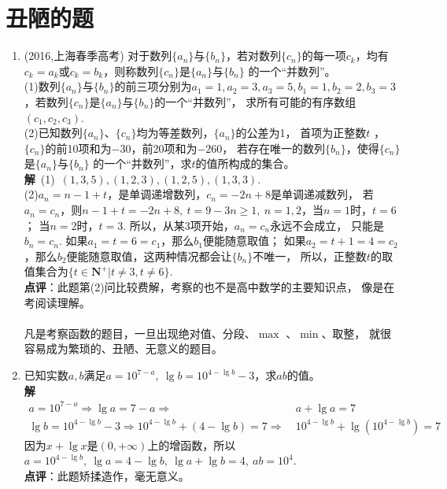 \section{丑陋的题}
\begin{enumerate}[label={【\textbf{例\thechapter.\arabic*}】},
 leftmargin=\inteval{\myenumleftmargin}pt,
 itemsep=\inteval{\myenumitempsep}pt,
 itemindent=\inteval{\myenumitemindent}pt]
\item (2016,上海春季高考)
对于数列$ \{a_n\} $与$ \{b_n\} $，若对数列$ \{c_n\} $的每一项$ c_k $，均有
$ c_k=a_k $或$ c_k=b_k $，则称数列$ \{c_n\} $是$ \{a_n\} $与$ \{b_n\} $
的一个“并数列”。\\
(1)数列$ \{a_n\} $与$ \{b_n\} $的前三项分别为$ a_1=1,a_2=3,a_3=5,b_1=1,b_2=2,
b_3=3 $，若数列$ \{c_n\} $是$ \{a_n\} $与$ \{b_n\} $的一个“并数列”，
求所有可能的有序数组$ (c_1,c_2,c_3) $. \\
(2)已知数列$ \{a_n\} $、$ \{c_n\} $均为等差数列，$ \{a_n\} $的公差为1，
首项为正整数$ t $ ，$ \{c_n\} $的前10项和为$ -30 $，前20项和为$ -260 $，
若存在唯一的数列$ \{b_n\} $，使得$ \{c_n\} $是$ \{a_n\} $与$ \{b_n\} $
的一个“并数列”，求$ t $的值所构成的集合。\\
\textbf{解}\ (1)\ $ (1,3,5),(1,2,3),(1,2,5),(1,3,3) $. \\
(2)$ a_n=n-1+t $，是单调递增数列，$ c_n=-2n+8 $是单调递减数列，
若$ a_n=c_n $，则$ n-1+t=-2n+8,\ t=9-3n\geq 1,\ n=1,2 $，当$ n=1 $时，$ t=6 $；
当$ n=2 $时，$ t=3 $. 所以，从某3项开始，$ a_n=c_n $永远不会成立，
只能是$ b_n=c_n $. 如果$ a_1=t=6=c_1 $，那么$ b_1 $便能随意取值；
如果$ a_2=t+1=4=c_2 $，那么$ b_2 $便能随意取值，这两种情况都会让$ \{b_n\} $不唯一，
所以，正整数$ t $的取值集合为$ \{t\in \textbf{N}^+|t\neq 3,t\neq 6\} $. \\
\textbf{点评}：此题第(2)问比较费解，考察的也不是高中数学的主要知识点，
像是在考阅读理解。\\
\\
凡是考察函数的题目，一旦出现绝对值、分段、$ \max $ 、$ \min $、取整，
就很容易成为繁琐的、丑陋、无意义的题目。

\item 已知实数$ a,b $满足$ a=10^{7-a},\ \lg b=10^{4-\lg b}-3 $，求$ ab $的值。\\
\textbf{解}\ 
\begin{align*}
    a=10^{7-a} \Rightarrow \lg a=7-a \Rightarrow &\  a+\lg a=7 \\
    \lg b=10^{4-\lg b}-3 \Rightarrow 10^{4-\lg b}+(4-\lg b)=7 \Rightarrow & \ 
    10^{4-\lg b}+\lg (10^{4-\lg b})=7 
\end{align*}
因为$ x+\lg x $是$ (0,+\infty) $上的增函数，所以$ a=10^{4-\lg b},\ \lg a=4-\lg b,\ 
\lg a+\lg b=4,\ ab=10^4 $. \\
\textbf{点评}：此题矫揉造作，毫无意义。


\end{enumerate}
